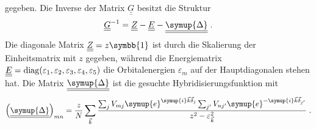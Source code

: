 gegeben.
Die Inverse der Matrix  $\underline{\underline{G}}$ besitzt die Struktur 
\begin{equation}
    \underline{\underline{G}}^{-1} = \underline{\underline{Z}} - \underline{\underline{E}} - \underline{\underline{\symup{\Delta}}} \; .
\end{equation}
Die diagonale Matrix $\underline{\underline{Z}} = z\symbb{1}$ ist durch die Skalierung der Einheitsmatrix mit $z$ gegeben, während die Energiematrix 
$\underline{\underline{E}} = \operatorname{diag}(\varepsilon_1, \varepsilon_2, \varepsilon_3, \varepsilon_4, \varepsilon_5)$
die Orbitalenergien $\varepsilon_m$ auf der Hauptdiagonalen stehen hat.
Die Matrix $\underline{\underline{\symup{\Delta}}}$ ist die gesuchte Hybridisierungsfunktion mit 
\begin{equation*}
    \left ( \underline{\underline{\symup{\Delta}}} \right )_{mn} =  \frac{z}{N}\sum_{\vec{k}}
    \frac{\sum_j V_{mj}\symup{e}^{\symup{i}\vec{k}\vec{\delta}_j}\sum_{j'} V_{nj'}\symup{e}^{-\symup{i}\vec{k}\vec{\delta}_{j'}}}
    {z^2-\varepsilon_{\vec{k}}^2} \; .
\end{equation*}

